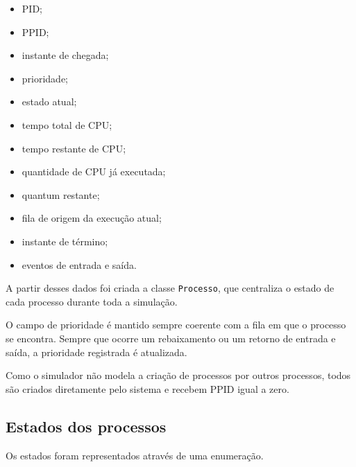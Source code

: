 \documentclass[12pt,a4paper]{article}
\begin{document}
\begin{itemize}

    \item PID;

    \item PPID;

    \item instante de chegada;

    \item prioridade;

    \item estado atual;

    \item tempo total de CPU;

    \item tempo restante de CPU;

    \item quantidade de CPU já executada;

    \item quantum restante;

    \item fila de origem da execução atual;

    \item instante de término;

    \item eventos de entrada e saída.

\end{itemize}

A partir desses dados foi criada a classe \texttt{Processo}, que
centraliza o estado de cada processo durante toda a simulação.

O campo de prioridade é mantido sempre coerente com a fila em que o
processo se encontra. Sempre que ocorre um rebaixamento ou um retorno
de entrada e saída, a prioridade registrada é atualizada.

Como o simulador não modela a criação de processos por outros
processos, todos são criados diretamente pelo sistema e recebem PPID
igual a zero.



\subsection{Estados dos processos}

Os estados foram representados através de uma enumeração.
\end{document}
